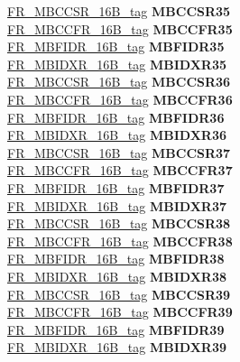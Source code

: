 \begin{DoxyCompactItemize}
\begin{tabbing}
\>\>\mbox{\hyperlink{unionFR__MBCCSR__16B__tag}{FR\_MBCCSR\_16B\_tag}} {\bfseries MBCCSR35}\\
\>\>\mbox{\hyperlink{unionFR__MBCCFR__16B__tag}{FR\_MBCCFR\_16B\_tag}} {\bfseries MBCCFR35}\\
\>\>\mbox{\hyperlink{unionFR__MBFIDR__16B__tag}{FR\_MBFIDR\_16B\_tag}} {\bfseries MBFIDR35}\\
\>\>\mbox{\hyperlink{unionFR__MBIDXR__16B__tag}{FR\_MBIDXR\_16B\_tag}} {\bfseries MBIDXR35}\\
\>\>\mbox{\hyperlink{unionFR__MBCCSR__16B__tag}{FR\_MBCCSR\_16B\_tag}} {\bfseries MBCCSR36}\\
\>\>\mbox{\hyperlink{unionFR__MBCCFR__16B__tag}{FR\_MBCCFR\_16B\_tag}} {\bfseries MBCCFR36}\\
\>\>\mbox{\hyperlink{unionFR__MBFIDR__16B__tag}{FR\_MBFIDR\_16B\_tag}} {\bfseries MBFIDR36}\\
\>\>\mbox{\hyperlink{unionFR__MBIDXR__16B__tag}{FR\_MBIDXR\_16B\_tag}} {\bfseries MBIDXR36}\\
\>\>\mbox{\hyperlink{unionFR__MBCCSR__16B__tag}{FR\_MBCCSR\_16B\_tag}} {\bfseries MBCCSR37}\\
\>\>\mbox{\hyperlink{unionFR__MBCCFR__16B__tag}{FR\_MBCCFR\_16B\_tag}} {\bfseries MBCCFR37}\\
\>\>\mbox{\hyperlink{unionFR__MBFIDR__16B__tag}{FR\_MBFIDR\_16B\_tag}} {\bfseries MBFIDR37}\\
\>\>\mbox{\hyperlink{unionFR__MBIDXR__16B__tag}{FR\_MBIDXR\_16B\_tag}} {\bfseries MBIDXR37}\\
\>\>\mbox{\hyperlink{unionFR__MBCCSR__16B__tag}{FR\_MBCCSR\_16B\_tag}} {\bfseries MBCCSR38}\\
\>\>\mbox{\hyperlink{unionFR__MBCCFR__16B__tag}{FR\_MBCCFR\_16B\_tag}} {\bfseries MBCCFR38}\\
\>\>\mbox{\hyperlink{unionFR__MBFIDR__16B__tag}{FR\_MBFIDR\_16B\_tag}} {\bfseries MBFIDR38}\\
\>\>\mbox{\hyperlink{unionFR__MBIDXR__16B__tag}{FR\_MBIDXR\_16B\_tag}} {\bfseries MBIDXR38}\\
\>\>\mbox{\hyperlink{unionFR__MBCCSR__16B__tag}{FR\_MBCCSR\_16B\_tag}} {\bfseries MBCCSR39}\\
\>\>\mbox{\hyperlink{unionFR__MBCCFR__16B__tag}{FR\_MBCCFR\_16B\_tag}} {\bfseries MBCCFR39}\\
\>\>\mbox{\hyperlink{unionFR__MBFIDR__16B__tag}{FR\_MBFIDR\_16B\_tag}} {\bfseries MBFIDR39}\\
\>\>\mbox{\hyperlink{unionFR__MBIDXR__16B__tag}{FR\_MBIDXR\_16B\_tag}} {\bfseries MBIDXR39}\\

\end{tabbing}
\end{DoxyCompactItemize}
